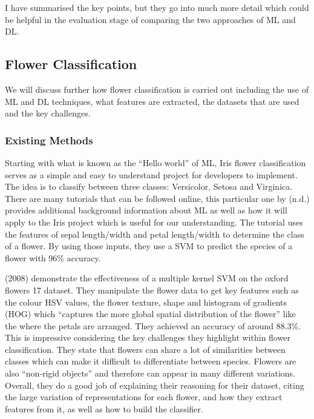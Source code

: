 \documentclass{article}
\begin{document}
I have summarised the key points, but they go into much more detail which could be helpful in the evaluation stage 
of comparing the two approaches of ML and DL.

\subsection{Flower Classification}

We will discuss further how flower classification is carried out including the use of ML and DL techniques, what 
features are extracted, the datasets that are used and the key challenges.

\subsubsection{Existing Methods}

Starting with what is known as the “Hello world” of ML, Iris flower classification serves as a simple and easy to 
understand project for developers to implement. The idea is to classify between three classes: Versicolor, Setosa and 
Virginica. There are many tutorials that can be followed online, this particular one by \citeauthor{DataFlairND} (n.d.) 
provides additional background information about ML as well as how it will apply to the Iris project which is useful for
our understanding. The tutorial uses the features of sepal length/width and petal length/width to determine the class of
a flower. By using those inputs, they use a SVM to predict the species of a flower with 96\% accuracy.

\par

\citeauthor{Nilsback2008} (2008) demonstrate the effectiveness of a multiple kernel SVM on the oxford flowers 17 dataset. 
They manipulate the flower data to get key features such as the colour HSV values, the flower texture, shape and 
histogram of gradients (HOG) which “captures the more global spatial distribution of the flower” like the where the 
petals are arranged. They achieved an accuracy of around 88.3\%. This is impressive considering the key challenges they 
highlight within flower classification. They state that flowers can share a lot of similarities between classes which 
can make it difficult to differentiate between species. Flowers are also “non-rigid objects” and therefore can appear in
many different variations. Overall, they do a good job of explaining their reasoning for their dataset, citing the 
large variation of representations for each flower, and how they extract features from it, as well as how to build the
classifier.
\end{document}
